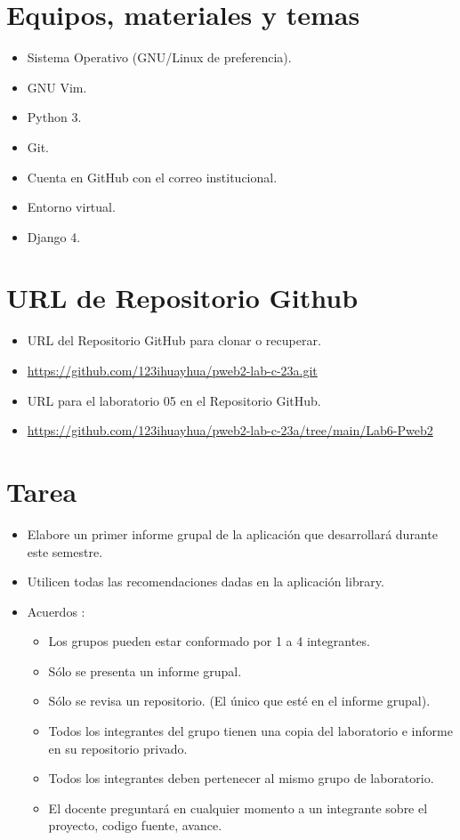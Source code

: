 \documentclass{article}
\begin{document}
	\section{Equipos, materiales y temas}
	\begin{itemize}
		\item Sistema Operativo (GNU/Linux de preferencia).
		\item GNU Vim.
		\item Python 3.
		\item Git.
		\item Cuenta en GitHub con el correo institucional.
		\item Entorno virtual.
		\item Django 4.	
	\end{itemize}
	
	\section{URL de Repositorio Github}
	\begin{itemize}
		\item URL del Repositorio GitHub para clonar o recuperar.
		\item \url{https://github.com/123ihuayhua/pweb2-lab-c-23a.git}
		\item URL para el laboratorio 05 en el Repositorio GitHub.
		\item \url{https://github.com/123ihuayhua/pweb2-lab-c-23a/tree/main/Lab6-Pweb2}
	\end{itemize}

    
    \section{Tarea}
    \begin{itemize}
        \item Elabore un primer informe grupal de la aplicación que desarrollará durante este semestre.
        \item Utilicen todas las recomendaciones dadas en la aplicación library.
        \item Acuerdos :
        \begin{itemize}
            \item Los grupos pueden estar conformado por 1 a 4 integrantes.
            \item Sólo se presenta un informe grupal.
            \item Sólo se revisa un repositorio. (El único que esté en el informe grupal).
            \item Todos los integrantes del grupo tienen una copia del laboratorio e informe en su repositorio privado.
            \item Todos los integrantes deben pertenecer al mismo grupo de laboratorio.
            \item El docente preguntará en cualquier momento a un integrante sobre el proyecto, codigo fuente, avance.
        \end{itemize}
    \end{itemize}
\end{document}
